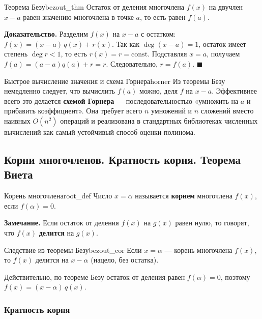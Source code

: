 \documentclass[12pt,a4paper]{article}
\newenvironment{myproof}{\noindent\textbf{Доказательство.}}{\hfill$\blacksquare$}
\begin{document}
\begin{theorem}{Теорема Безу}{bezout_thm}
Остаток от деления многочлена $f(x)$ на двучлен $x - a$ равен
значению многочлена в точке $a$, то есть равен $f(a)$.
\end{theorem}

\begin{myproof}
Разделим $f(x)$ на $x - a$ с остатком:
$f(x) = (x - a)\, q(x) + r(x)$. Так как $\deg(x - a) = 1$, остаток
имеет степень $\deg r < 1$, то есть $r(x) = r = \mathrm{const}$.
Подставляя $x = a$, получаем
$f(a) = (a - a) q(a) + r = r$. Следовательно, $r = f(a)$.
\end{myproof}

\begin{remarkIT}{Быстрое вычисление значения и схема Горнера}{horner}
Из теоремы Безу немедленно следует, что вычислить $f(a)$ можно,
деля $f$ на $x - a$. Эффективнее всего это делается \textbf{схемой
Горнера} — последовательностью «умножить на $a$ и прибавить
коэффициент». Она требует всего $n$ умножений и $n$ сложений вместо
наивных $O(n^2)$ операций и реализована в стандартных библиотеках
численных вычислений как самый устойчивый способ оценки полинома.
\end{remarkIT}

\subsection{Корни многочленов. Кратность корня. Теорема Виета}

\begin{definition}{Корень многочлена}{root_def}
Число $x = \alpha$ называется \textbf{корнем} многочлена $f(x)$,
если $f(\alpha) = 0$.
\end{definition}

\noindent\textbf{Замечание.} Если остаток от деления $f(x)$ на $g(x)$
равен нулю, то говорят, что $f(x)$ \textbf{делится} на $g(x)$.

\begin{theorem}{Следствие из теоремы Безу}{bezout_cor}
Если $x = \alpha$ — корень многочлена $f(x)$, то $f(x)$ делится на
$x - \alpha$ (нацело, без остатка).
\end{theorem}

\noindent Действительно, по теореме Безу остаток от деления равен
$f(\alpha) = 0$, поэтому $f(x) = (x - \alpha)\, q(x)$.

\subsubsection*{Кратность корня}
\end{document}
